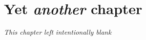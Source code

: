 \chapter{Yet \emph{another} chapter}
\label{cha:yet_another_chapter}

\emph{This chapter left intentionally blank}